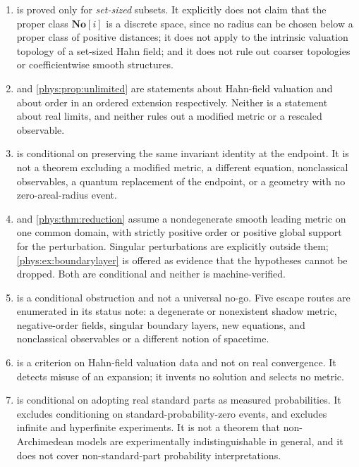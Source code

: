 \documentclass[11pt,letterpaper]{article}
\numberwithin{equation}{section}
\theoremstyle{definition}
\theoremstyle{remark}
\newcommand{\SC}{\mathbf{No}[i]}
\begin{document}
\begin{enumerate}[label=\textup{N\arabic*.},leftmargin=3.0em,start=11]
\item {} is proved only for \emph{set-sized} subsets. It
explicitly does not claim that the proper class $\SC$ is a discrete space,
since no radius can be chosen below a proper class of positive distances; it
does not apply to the intrinsic valuation topology of a set-sized Hahn field;
and it does not rule out coarser topologies or coefficientwise smooth
structures.
\item {} and \cref{phys:prop:unlimited} are statements about
Hahn-field valuation and about order in an ordered extension respectively.
Neither is a statement about real limits, and neither rules out a modified
metric or a rescaled observable.
\item {} is conditional on preserving the same
invariant identity at the endpoint. It is not a theorem excluding a modified
metric, a different equation, nonclassical observables, a quantum replacement
of the endpoint, or a geometry with no zero-areal-radius event.
\item {} and \cref{phys:thm:reduction} assume a
nondegenerate smooth leading metric on one common domain, with strictly
positive order or positive global support for the perturbation. Singular
perturbations are explicitly outside them; \cref{phys:ex:boundarylayer} is
offered as evidence that the hypotheses cannot be dropped. Both are conditional
and neither is machine-verified.
\item {} is a conditional obstruction and not a universal
no-go. Five escape routes are enumerated in its status note: a degenerate or
nonexistent shadow metric, negative-order fields, singular boundary layers, new
equations, and nonclassical observables or a different notion of spacetime.
\item {} is a criterion on Hahn-field valuation data and
not on real convergence. It detects misuse of an expansion; it invents no
solution and selects no metric.
\item {} is conditional on adopting real standard
parts as measured probabilities. It excludes conditioning on
standard-probability-zero events, and excludes infinite and hyperfinite
experiments. It is not a theorem that non-Archimedean models are
experimentally indistinguishable in general, and it does not cover
non-standard-part probability interpretations.

\end{enumerate}
\end{document}
